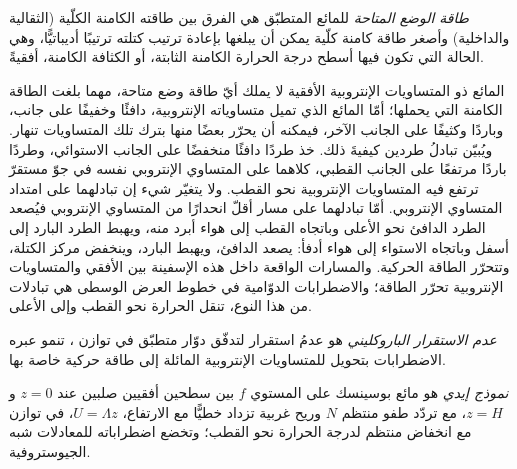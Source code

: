 \begin{definition}\label{def:b3:atmospheric-dynamics:ape}
\emph{طاقة الوضع المتاحة} للمائع المتطبّق
هي الفرق بين طاقته الكامنة الكلّية
(الثقالية والداخلية) وأصغر طاقة كامنة كلّية يمكن أن يبلغها
بإعادة ترتيب كتلته ترتيبًا أديباتيًّا، وهي الحالة التي
تكون فيها أسطح درجة الحرارة الكامنة الثابتة، أو الكثافة الكامنة،
أفقيةً.
\end{definition}

المائع ذو المتساويات الإنتروبية الأفقية لا يملك أيّ طاقة وضع متاحة، مهما بلغت
الطاقة الكامنة التي يحملها؛ أمّا المائع الذي تميل متساوياته الإنتروبية، دافئًا وخفيفًا على جانب، وباردًا
وكثيفًا على الجانب الآخر، فيمكنه أن يحرّر بعضًا منها بترك تلك المتساويات تنهار. ويُبيّن تبادلُ طردين كيفيةَ ذلك.
خذ طردًا دافئًا منخفضًا على الجانب الاستوائي، وطردًا باردًا مرتفعًا على الجانب القطبي،
كلاهما على المتساوي الإنتروبي نفسه في جوّ مستقرّ
ترتفع فيه المتساويات الإنتروبية نحو القطب. ولا يتغيّر شيء إن تبادلهما على امتداد
المتساوي الإنتروبي. أمّا تبادلهما على مسار أقلّ انحدارًا من المتساوي الإنتروبي
فيُصعد الطرد الدافئ نحو الأعلى وباتجاه القطب إلى هواء أبرد منه،
ويهبط الطرد البارد إلى أسفل وباتجاه الاستواء إلى هواء أدفأ: يصعد الدافئ،
ويهبط البارد، وينخفض مركز الكتلة، وتتحرّر الطاقة
الحركية. والمسارات الواقعة داخل هذه الإسفينة بين الأفقي
والمتساويات الإنتروبية تحرّر الطاقة؛ والاضطرابات الدوّامية في خطوط العرض الوسطى هي
تبادلات من هذا النوع، تنقل الحرارة نحو القطب وإلى الأعلى.

\begin{definition}\label{def:b3:atmospheric-dynamics:baroclinic-instability}
\emph{عدم الاستقرار الباروكليني} هو عدمُ استقرار
لتدفّق دوّار متطبّق في توازن ، تنمو عبره الاضطرابات
بتحويل  للمتساويات الإنتروبية
المائلة إلى طاقة حركية خاصة بها.
\end{definition}

\begin{definition}\label{def:b3:atmospheric-dynamics:eady}
\emph{نموذج إيدي} هو مائع بوسينسك على
المستوي $f$ بين سطحين أفقيين صلبين عند $z = 0$ و$z = H$، مع
تردّد طفو منتظم $N$ وريح غربية تزداد خطيًّا
مع الارتفاع، $U = \Lambda z$، في توازن  مع انخفاض منتظم
لدرجة الحرارة نحو القطب؛ وتخضع اضطراباته للمعادلات
شبه الجيوستروفية.
\end{definition}

